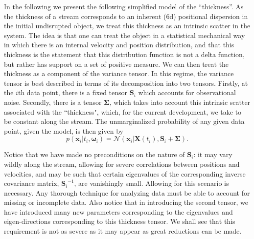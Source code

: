\documentclass[12pt,preprint]{aastex}
\theoremstyle{plain}
\theoremstyle{definition}
\newcommand{\mtensor}[1]{\boldsymbol{#1}}
\newcommand{\mS}{\mtensor{S}}
\newcommand{\mSigma}{\mtensor{\Sigma}}
\newcommand{\mvector}[1]{\mtensor{#1}}
\newcommand{\vx}{\mvector{x}}
\newcommand{\vX}{\mvector{X}}
\newcommand{\vomega}{\mvector{\omega}}
\newcommand{\inverse}[1]{{#1}^{-1}}
\newcommand{\normal}{\mathscr{N}}
\begin{document}
In the following we present the following simplified model of the ``thickness''. As the thickness of a stream corresponds to an inherent (6d) positional dispersion in the initial undisrupted object, we treat this thickness as an intrinsic scatter in the system. The idea is that one can treat the object in a statistical mechanical way in which there is an internal velocity and position distribution, and that this thickness is the statement that this distribution function is not a delta function, but rather has support on a set of positive measure.  We can then treat the thickness as a component of the variance tensor. In this regime, the variance tensor is best described in terms of its decomposition into two tensors. Firstly, at the $i$th data point, there is a fixed tensor $\mS_i$ which accounts for observational noise. Secondly, there is a tensor $\mSigma$, which takes into account this intrinsic scatter associated with the ``thickness", which, for the current development, we take to be constant along the stream. The unmarginalized probability of any given data point, given the model, is then given by
\begin{equation}\label{unmarginalized_prob}
p(\vx_i | t_i, \vomega_i)  = \normal(\vx_i |\vX(t_i), \mS_i + \mSigma).
\end{equation}
 

Notice that we have made no preconditions on the nature of $\mS_i$: it may vary wildly along the stream, allowing for severe correlations between positions and velocities, and may be such that certain eigenvalues of the corresponding inverse covariance matrix, $\inverse{\mS_i}$, are vanishingly small. Allowing for this scenario is necessary. Any thorough technique for analyzing data must be able to account for missing or incomplete data. Also notice that in introducing the second tensor, we have introduced many new parameters corresponding to the eigenvalues and eigen-directions corresponding to this thickness tensor. We shall see that this requirement is not as severe as it may appear as great reductions can be made. 
\end{document}
